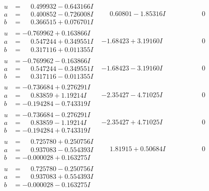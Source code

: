 \documentclass[1p]{elsarticle_modified}
\theoremstyle{definition}
\begin{document}
$$\begin{array}{c|c|c}
\begin{aligned}
u &= \phantom{-}0.499932 - 0.643166 I \\
a &= \phantom{-}0.400852 - 0.726008 I \\
b &= \phantom{-}0.366515 + 0.076701 I\end{aligned}
 & \phantom{-}0.60801 - 1.85316 I & \phantom{-0.000000 } 0 \\ \hline\begin{aligned}
u &= -0.769962 + 0.163866 I \\
a &= \phantom{-}0.547244 + 0.349551 I \\
b &= \phantom{-}0.317116 + 0.011355 I\end{aligned}
 & -1.68423 + 3.19160 I & \phantom{-0.000000 } 0 \\ \hline\begin{aligned}
u &= -0.769962 - 0.163866 I \\
a &= \phantom{-}0.547244 - 0.349551 I \\
b &= \phantom{-}0.317116 - 0.011355 I\end{aligned}
 & -1.68423 - 3.19160 I & \phantom{-0.000000 } 0 \\ \hline\begin{aligned}
u &= -0.736684 + 0.276291 I \\
a &= \phantom{-}0.83859 + 1.19214 I \\
b &= -0.194284 - 0.743319 I\end{aligned}
 & -2.35427 - 4.71025 I & \phantom{-0.000000 } 0 \\ \hline\begin{aligned}
u &= -0.736684 - 0.276291 I \\
a &= \phantom{-}0.83859 - 1.19214 I \\
b &= -0.194284 + 0.743319 I\end{aligned}
 & -2.35427 + 4.71025 I & \phantom{-0.000000 } 0 \\ \hline\begin{aligned}
u &= \phantom{-}0.725780 + 0.250756 I \\
a &= \phantom{-}0.937083 - 0.554393 I \\
b &= -0.000028 + 0.163275 I\end{aligned}
 & \phantom{-}1.81915 + 0.50684 I & \phantom{-0.000000 } 0 \\ \hline\begin{aligned}
u &= \phantom{-}0.725780 - 0.250756 I \\
a &= \phantom{-}0.937083 + 0.554393 I \\
b &= -0.000028 - 0.163275 I\end{aligned}

\end{array}$$
\end{document}
